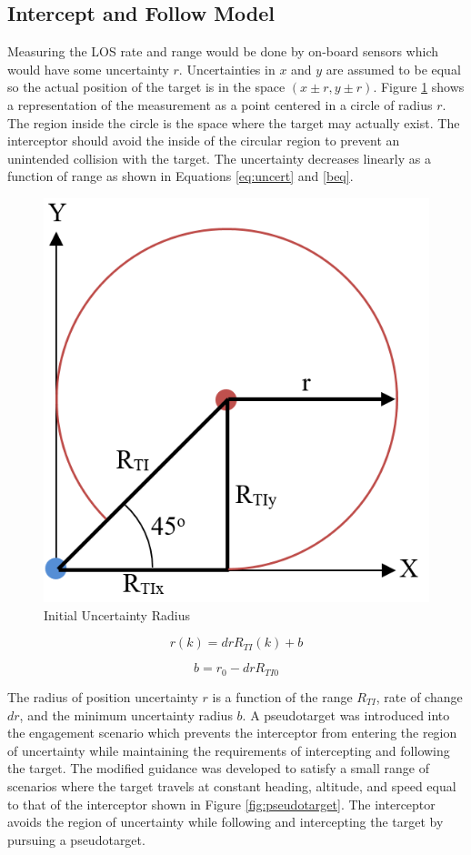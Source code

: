 \documentclass[]{aiaa-tc}%
\begin{document}
\subsection{Intercept and Follow Model}
Measuring the LOS rate and range would be done by on-board sensors which would have some uncertainty $r$. Uncertainties in $x$ and $y$ are assumed to be equal so the actual position of the target is in the space $(x\pm r,y \pm r)$. Figure \ref{fig:uncertrad} shows a representation of the measurement as a point centered in a circle of radius $r$. The region inside the circle is the space where the target may actually exist. The interceptor should avoid the inside of the circular region to prevent an unintended collision with the target. The uncertainty decreases linearly as a function of range as shown in Equations \ref{eq:uncert} and \ref{beq}.

\begin{figure}[H]
	\centering
	\includegraphics[width=6 cm]{45deguncert.PNG}
	\caption{Initial Uncertainty Radius}
	\label{fig:uncertrad}
\end{figure}

\begin{equation} \label{eq:uncert}
   r(k) = drR_{TI}(k)+b
\end{equation}

\begin{equation} \label{beq}
   b = r_0-drR_{TI0}
\end{equation}

The radius of position uncertainty $r$ is a function of the range $R_{TI}$, rate of change $dr$, and the minimum uncertainty radius $b$. A pseudotarget was introduced into the engagement scenario which prevents the interceptor from entering the region of uncertainty while maintaining the requirements of intercepting and following the target. The modified guidance was developed to satisfy a small range of scenarios where the target travels at constant heading, altitude, and speed equal to that of the interceptor shown in Figure \ref{fig:pseudotarget}. The interceptor avoids the region of uncertainty while following and intercepting the target by pursuing a pseudotarget. 
\end{document}
